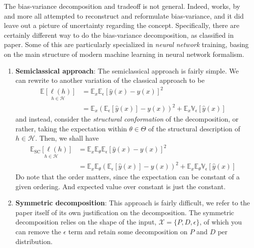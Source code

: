 The bias-variance decomposition and tradeoff is not general. Indeed, works, by \cite{6797087,sharma_bias-variance_2014,domingos_unifeid_2000,adlam2020understandingdoubledescentrequires,yang_rethinking_2020} and more all attempted to reconstruct and reformulate bias-variance, and it did leave out a picture of uncertainty regarding the concept. Specifically, there are certainly different way to do the bias-variance decomposition, as classified in \cite{adlam2020understandingdoubledescentrequires} paper. Some of this are particularly specialized in \textit{neural network} training, basing on the main structure of modern machine learning in neural network formalism. 
\begin{enumerate}[itemsep=1pt,topsep=1pt]
    \item \textbf{Semiclassical approach}: The semiclassical approach is fairly simple. We can rewrite to another variation of the classical approach to be \begin{equation}
        \begin{split}
            \underset{h\in\mathcal{H}}{\mathbb{E}[\ell(h)]} &= \mathbb{E}_{x}\mathbb{E}_{\epsilon}\left[\hat{y}(x)-y(x)\right]^{2}\\
             &= \mathbb{E}_{x}\left(\mathbb{E}_{\epsilon}[\hat{y}(x)]-y(x)\right)^{2} + \mathbb{E}_{x}\mathbb{V}_{\epsilon}\left[\hat{y}(x)\right]  
        \end{split}
    \end{equation}
    and instead, consider the \textit{structural conformation} of the decomposition, or rather, taking the expectation within $\theta\in \Theta$ of the structural description of $h\in\mathcal{H}$. Then, we shall have 
    \begin{equation}
        \begin{split}
            \underset{h\in\mathcal{H}}{\mathbb{E}_{\mathrm{SC}}[\ell(h)]} 
            &= \mathbb{E}_{x}\mathbb{E}_{\theta}\mathbb{E}_{\epsilon}\left[\hat{y}(x)-y(x)\right]^{2} \\
            &= \mathbb{E}_{x}\mathbb{E}_{\theta}\left(\mathbb{E}_{\epsilon}[\hat{y}(x)]-y(x)\right)^{2} + \mathbb{E}_{x}\mathbb{E}_{\theta}\mathbb{V}_{\epsilon}\left[\hat{y}(x)\right]
        \end{split}
    \end{equation}
    Do note that the order matters, since the expectation can be constant of a given ordering. And expected value over constant is just the constant. 
    \item \textbf{Symmetric decomposition}: This approach is fairly difficult, we refer to the paper itself of its own justification on the decomposition. The symmetric decomposition relies on the shape of the input, $\mathcal{X}=\{P,D,\epsilon\}$, of which you can remove the $\epsilon$ term and retain some decomposition on $P$ and $D$ per distribution. 
\end{enumerate}

